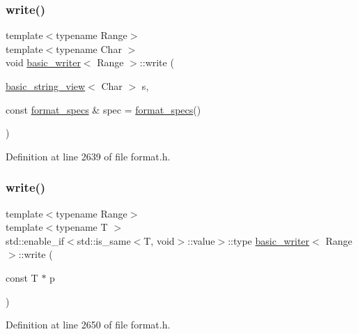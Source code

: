 \subsubsection{\texorpdfstring{write()}{write()}\hspace{0.1cm}{\footnotesize\ttfamily [15/16]}}
{\footnotesize\ttfamily template$<$typename Range$>$ \\
template$<$typename Char $>$ \\
void \hyperlink{classbasic__writer}{basic\+\_\+writer}$<$ Range $>$\+::write (\begin{DoxyParamCaption}\item[{\hyperlink{classbasic__string__view}{basic\+\_\+string\+\_\+view}$<$ Char $>$}]{s,  }\item[{const \hyperlink{classbasic__writer_ad0e2925cf7d02e0ccb6da44c06d64e55}{format\+\_\+specs} \&}]{spec = {\ttfamily \hyperlink{classbasic__writer_ad0e2925cf7d02e0ccb6da44c06d64e55}{format\+\_\+specs}()} }\end{DoxyParamCaption})\hspace{0.3cm}{\ttfamily [inline]}}



Definition at line 2639 of file format.\+h.

\mbox{\label{classbasic__writer_ae8492113422d70a65c845000e9f964a0}} 
\subsubsection{\texorpdfstring{write()}{write()}\hspace{0.1cm}{\footnotesize\ttfamily [16/16]}}
{\footnotesize\ttfamily template$<$typename Range$>$ \\
template$<$typename T $>$ \\
std\+::enable\+\_\+if$<$std\+::is\+\_\+same$<$T, void$>$\+::value$>$\+::type \hyperlink{classbasic__writer}{basic\+\_\+writer}$<$ Range $>$\+::write (\begin{DoxyParamCaption}\item[{const T $\ast$}]{p }\end{DoxyParamCaption})\hspace{0.3cm}{\ttfamily [inline]}}



Definition at line 2650 of file format.\+h.



